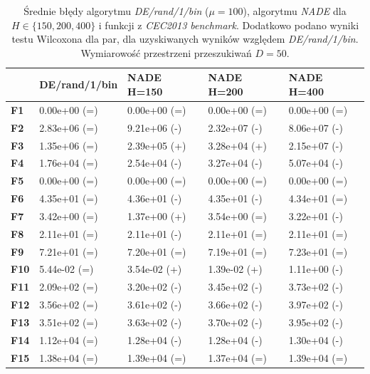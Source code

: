 \documentclass[12pt,a4paper]{report}
\begin{document}
{{{{{{{\begin{table}[h]
\centering
\caption{Średnie błędy algorytmu \emph{DE/rand/1/bin} ($\mu = 100$), algorytmu \emph{NADE} dla $H \in \{150, 200, 400\}$ i funkcji z \emph{CEC2013 benchmark}. Dodatkowo podano wyniki testu Wilcoxona dla par, dla uzyskiwanych wyników względem \emph{DE/rand/1/bin}. Wymiarowość przestrzeni przeszukiwań $D = 50$.}
\label{Eksp150}
\begin{tabular}{|l|l|l|l|l|}
\hline
          & {\bf DE/rand/1/bin} & {\bf NADE H=150} & {\bf NADE H=200} & {\bf NADE H=400} \\ \hline
{\bf F1}  & 0.00e+00 (=)        & 0.00e+00 (=)     & 0.00e+00 (=)     & 0.00e+00 (=)     \\ \hline
{\bf F2}  & 2.83e+06 (=)        & 9.21e+06 (-)     & 2.32e+07 (-)     & 8.06e+07 (-)     \\ \hline
{\bf F3}  & 1.35e+06 (=)        & 2.39e+05 (+)     & 3.28e+04 (+)     & 2.15e+07 (-)     \\ \hline
{\bf F4}  & 1.76e+04 (=)        & 2.54e+04 (-)     & 3.27e+04 (-)     & 5.07e+04 (-)     \\ \hline
{\bf F5}  & 0.00e+00 (=)        & 0.00e+00 (=)     & 0.00e+00 (=)     & 0.00e+00 (=)     \\ \hline
{\bf F6}  & 4.35e+01 (=)        & 4.36e+01 (-)     & 4.35e+01 (-)     & 4.34e+01 (=)     \\ \hline
{\bf F7}  & 3.42e+00 (=)        & 1.37e+00 (+)     & 3.54e+00 (=)     & 3.22e+01 (-)     \\ \hline
{\bf F8}  & 2.11e+01 (=)        & 2.11e+01 (-)     & 2.11e+01 (=)     & 2.11e+01 (=)     \\ \hline
{\bf F9}  & 7.21e+01 (=)        & 7.20e+01 (=)     & 7.19e+01 (=)     & 7.23e+01 (=)     \\ \hline
{\bf F10} & 5.44e-02 (=)        & 3.54e-02 (+)     & 1.39e-02 (+)     & 1.11e+00 (-)     \\ \hline
{\bf F11} & 2.09e+02 (=)        & 3.20e+02 (-)     & 3.45e+02 (-)     & 3.73e+02 (-)     \\ \hline
{\bf F12} & 3.56e+02 (=)        & 3.61e+02 (-)     & 3.66e+02 (-)     & 3.97e+02 (-)     \\ \hline
{\bf F13} & 3.51e+02 (=)        & 3.63e+02 (-)     & 3.70e+02 (-)     & 3.95e+02 (-)     \\ \hline
{\bf F14} & 1.12e+04 (=)        & 1.28e+04 (-)     & 1.28e+04 (-)     & 1.30e+04 (-)     \\ \hline
{\bf F15} & 1.38e+04 (=)        & 1.39e+04 (=)     & 1.37e+04 (=)     & 1.39e+04 (=)     \\ \hline

\end{tabular}
\end{table}}}}}}}}
\end{document}
